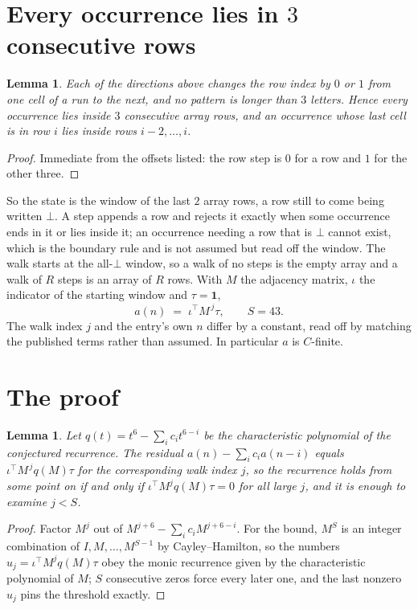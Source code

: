 \documentclass[11pt,a4paper]{article}
\theoremstyle{plain}
\newtheorem{lemma}[theorem]{Lemma}
\theoremstyle{definition}
\begin{document}
\section{Every occurrence lies in $3$ consecutive rows}

\begin{lemma}\label{lem:win}
Each of the directions above changes the row index by $0$ or $1$ from one cell of a run to the
next, and no pattern is longer than $3$ letters. Hence every occurrence lies inside $3$
consecutive array rows, and an occurrence whose last cell is in row $i$ lies inside rows
$i-2,\dots,i$.
\end{lemma}

\begin{proof}
Immediate from the offsets listed: the row step is $0$ for a row and $1$ for the other three.
\end{proof}

So the state is the window of the last $2$ array rows, a row still to come being written
$\bot$. A step appends a row and rejects it exactly when some occurrence ends in it or lies
inside it; an occurrence needing a row that is $\bot$ cannot exist, which is the boundary rule
and is not assumed but read off the window. The walk starts at the all-$\bot$ window, so a walk
of no steps is the empty array and a walk of $R$ steps is an array of $R$ rows. With $M$ the
adjacency matrix, $\iota$ the indicator of the starting window and $\tau=\mathbf{1}$,
\[
a(n)\;=\;\iota^{\!\top}M^{\,j}\tau ,\qquad S=43.
\]
The walk index $j$ and the entry's own $n$ differ by a constant, read off by matching the
published terms rather than assumed. In particular $a$ is $C$-finite.

\section{The proof}

\begin{lemma}\label{lem:crit}
Let $q(t)=t^{6}-\sum_i c_it^{6-i}$ be the characteristic polynomial of the
conjectured recurrence. The residual $a(n)-\sum_ic_ia(n-i)$ equals
$\iota^{\!\top}M^{\,j}q(M)\tau$ for the corresponding walk index $j$, so the recurrence
holds from some point on if and only if $\iota^{\!\top}M^{j}q(M)\tau=0$ for all large $j$,
and it is enough to examine $j<S$.
\end{lemma}

\begin{proof}
Factor $M^{j}$ out of $M^{j+6}-\sum_ic_iM^{j+6-i}$. For the bound, $M^{S}$
is an integer combination of $I,M,\dots,M^{S-1}$ by Cayley--Hamilton, so the numbers
$u_j=\iota^{\!\top}M^{j}q(M)\tau$ obey the monic recurrence given by the characteristic
polynomial of $M$; $S$ consecutive zeros force every later one, and the last nonzero $u_j$
pins the threshold exactly.
\end{proof}
\end{document}
